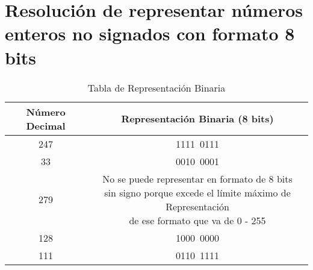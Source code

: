 \documentclass[12pt]{article}
\begin{document}
\vspace{2cm}

\section{Resolución de representar números enteros no signados con formato 8 bits}
\begin{table}[h!]
  \centering
  \begin{tabular}{|c|c|}  %
  \hline
  \textbf{Número Decimal} & \textbf{Representación Binaria (8 bits)} \\
  \hline  %
  247 & 1111\ 0111 \\
  \hline
  33  & 0010\ 0001 \\
  \hline
  279 & \makecell[l]{No se puede representar en formato de 8 bits\\ sin signo porque excede el límite máximo de Representación\\ de ese formato que va de 0 - 255} \\
  \hline
  128 & 1000\ 0000 \\
  \hline
  111 & 0110\ 1111 \\
  \hline  %
  \end{tabular}
  \caption{Tabla de Representación Binaria}
  \end{table}
    
\end{document}
